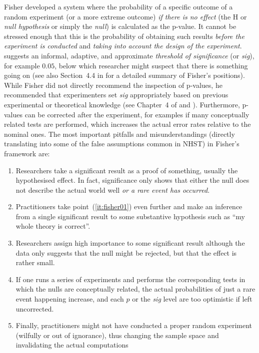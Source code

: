 Fisher developed a system where the probability of a specific outcome of a random experiment (or a more extreme outcome) \textit{if there is no effect} (the H or \textit{null hypothesis} or simply the \textit{null}) is calculated as the p-value.
It cannot be stressed enough that this is the probability of obtaining such results \textit{before the experiment is conducted} and \textit{taking into account the design of the experiment}.
\textcite[504]{Fisher1926} suggests an informal, adaptive, and approximate \textit{threshold of significance} (or \textit{sig}), for example $0.05$, below which researcher might suspect that there is something going on (see also Section~4.4 in \citealt{Lehmann2011} for a detailed summary of Fisher's positions).
While Fisher did not directly recommend the inspection of p-values, he recommended that experimenters set \textit{sig} appropriately based on previous experimental or theoretical knowledge (see Chapter~4 of \citealt{Lehmann2011} and \citealt{Perezgonzalez2015}).
Furthermore, p-values can be corrected after the experiment, for examples if many conceptually related tests are performed, which increases the actual error rates relative to the nominal ones.
The most important pitfalls and misunderstandings (directly translating into some of the false assumptions common in NHST) in Fisher's framework are:

\vspace{\baselineskip}
\begin{enumerate}
  \item \label{it:fisher01} Researchers take a significant result as a proof of something, usually the hypothesised effect.
    In fact, significance only shows that either the null does not describe the actual world well \textit{or a rare event has occurred}.
  \item \label{it:fisher02} Practitioners take point~(\ref{it:fisher01}) even further and make an inference from a single significant result to some substantive hypothesis such as ``my whole theory is correct''.
  \item \label{it:fisher03} Researchers assign high importance to some significant result although the data only suggests that the null might be rejected, but that the effect is rather small.
  \item \label{it:fisher04} If one runs a series of experiments and performs the corresponding tests in which the nulls are conceptually related, the actual probabilities of just a rare event happening increase, and each $p$ or the \textit{sig} level are too optimistic if left uncorrected.
  \item \label{it:fisher05} Finally, practitioners might not have conducted a proper random experiment (wilfully or out of ignorance), thus changing the sample space and invalidating the actual computations
\end{enumerate}
\vspace{\baselineskip}

